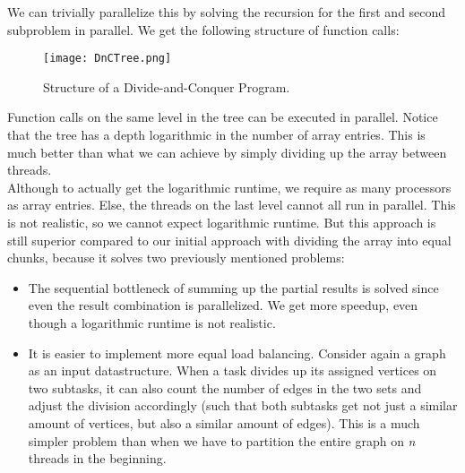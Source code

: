 \documentclass[main.tex]{subfiles}
\begin{document}
\noindent We can trivially parallelize this by solving the recursion for the first and second subproblem in parallel. We get the following structure of function calls:
\begin{figure}[H]
    \centering
    \texttt{[image: DnCTree.png]}
    \caption{Structure of a Divide-and-Conquer Program.}
\end{figure}
\noindent Function calls on the same level in the tree can be executed in parallel. Notice that the tree has a depth logarithmic in the number of array entries. This is much better than what we can achieve by simply dividing up the array between threads.\\
Although to actually get the logarithmic runtime, we require as many processors as array entries. Else, the threads on the last level cannot all run in parallel. This is not realistic, so we cannot expect logarithmic runtime. But this approach is still superior compared to our initial approach with dividing the array into equal chunks, because it solves two previously mentioned problems:
\begin{itemize}
  \item The sequential bottleneck of summing up the partial results is solved since even the result combination is parallelized. We get more speedup, even though a logarithmic runtime is not realistic.
  \item It is easier to implement more equal load balancing. Consider again a graph as an input datastructure. When a task divides up its assigned vertices on two subtasks, it can also count the number of edges in the two sets and adjust the division accordingly (such that both subtasks get not just a similar amount of vertices, but also a similar amount of edges). This is a much simpler problem than when we have to partition the entire graph on \textit{n} threads in the beginning.
\end{itemize}

\newpage
\end{document}
